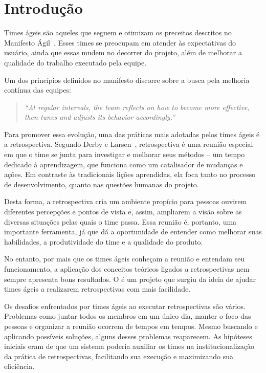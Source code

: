 \section{Introdução}
Times ágeis são aqueles que seguem e otimizam os preceitos descritos no Manifesto Ágil~\cite{manifesto}. Esses times se preocupam em atender às expectativas do usuário, ainda que essas mudem no decorrer do projeto, além de melhorar a qualidade do trabalho executado pela equipe.

Um dos princípios definidos no manifesto discorre sobre a busca pela melhoria contínua das equipes:

\begin{quote}
	\textit{``At regular intervals, the team reflects on how to become more effective, then tunes and adjusts its behavior accordingly.''}~\cite{manifesto}
\end{quote}

Para promover essa evolução, uma das práticas mais adotadas pelos times ágeis é a retrospectiva. Segundo Derby e Larsen~\cite{retrospectives}, retrospectiva é uma reunião especial em que o time se junta para investigar e melhorar seus métodos -- um tempo dedicado à aprendizagem, que funciona como um catalisador de mudanças e ações. Em contraste às tradicionais lições aprendidas, ela foca tanto no processo de desenvolvimento, quanto nas questões humanas do projeto.

Desta forma, a retrospectiva cria um ambiente propício para pessoas ouvirem diferentes percepções e pontos de vista e, assim, ampliarem a visão sobre as diversas situações pelas quais o time passa. Essa reunião é, portanto, uma importante ferramenta, já que dá a oportunidade de entender como melhorar suas habilidades, a produtividade do time e a qualidade do produto.

No entanto, por mais que os times ágeis conheçam a reunião e entendam seu funcionamento, a aplicação dos conceitos teóricos ligados a retrospectivas nem sempre apresenta bons resultados. O \suricato{} é um projeto que surgiu da ideia de ajudar times ágeis a realizarem retrospectivas com mais facilidade.

Os desafios enfrentados por times ágeis ao executar retrospectivas são vários. Problemas como juntar todos os membros em um único dia, manter o foco das pessoas e organizar a reunião ocorrem de tempos em tempos. Mesmo buscando e aplicando possíveis soluções, alguns desses problemas reaparecem. As hipóteses iniciais eram de que um sistema poderia auxiliar os times na institucionalização da prática de retrospectivas, facilitando sua execução e maximizando sua eficiência.

